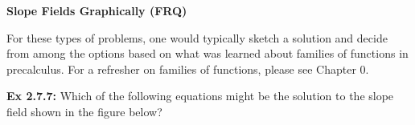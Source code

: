 \bigskip

\textbf{\large{Slope Fields Graphically (FRQ)}} \par

For these types of problems, one would typically sketch a solution and decide from among the options based on what was learned about families of functions in precalculus. For a refresher on families of functions, please see Chapter 0. \par

\begin{tcolorbox}[example]
    \textbf{Ex 2.7.7: } Which of the following equations might be the solution to the slope field shown in the figure below? \begin{center}
    \end{center} \vspace{11pt}


\end{tcolorbox}
